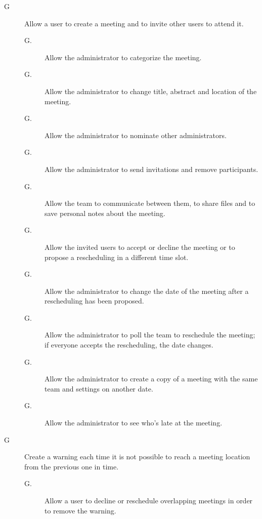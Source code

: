 \begin{description}
\item[G\thecount\label{goal:ManageMeeting}] Allow a user to create a meeting and to invite other users to attend it.
\begin{description}
\item[G\thecount.\thecountin] Allow the administrator to categorize the meeting.
\item[G\thecount.\thecountin\label{goal:EditMeeting}] Allow the administrator to change title, abstract and location of the meeting.
\item[G\thecount.\thecountin\label{goal:NominateAdmin}] Allow the administrator to nominate other administrators.
\item[G\thecount.\thecountin\label{goal:InviteUsers}] Allow the administrator to send invitations and remove participants.
\item[G\thecount.\thecountin\label{goal:ShareFiles}] Allow the team to communicate between them, to share files and to save personal notes about the meeting.
\item[G\thecount.\thecountin\label{goal:MeetingParticipation}] Allow the invited users to accept or decline the meeting or to propose a rescheduling in a different time slot.
\item[G\thecount.\thecountin\label{goal:RescheduleFromUser}] Allow the administrator to change the date of the meeting after a rescheduling has been proposed.
\item[G\thecount.\thecountin\label{goal:RescheduleFromAdmin}] Allow the administrator to poll the team to reschedule the meeting; if everyone accepts the rescheduling, the date changes.
\item[G\thecount.\thecountin\label{goal:RecreateMeeting}] Allow the administrator to create a copy of a meeting with the same team and settings on another date.
\item[G\thecount.\thecountin\label{goal:ViewLateUsers}] Allow the administrator to see who’s late at the meeting.
\end{description}

\setcounter{countin}{1}

\item[G\thecount\label{goal:Warning}] Create a warning each time it is not possible to reach a meeting location from the previous one in time.
\begin{description}
\item[G\thecount.\thecountin] Allow a user to decline or reschedule overlapping meetings in order to remove the warning.
\end{description}


\end{description}
